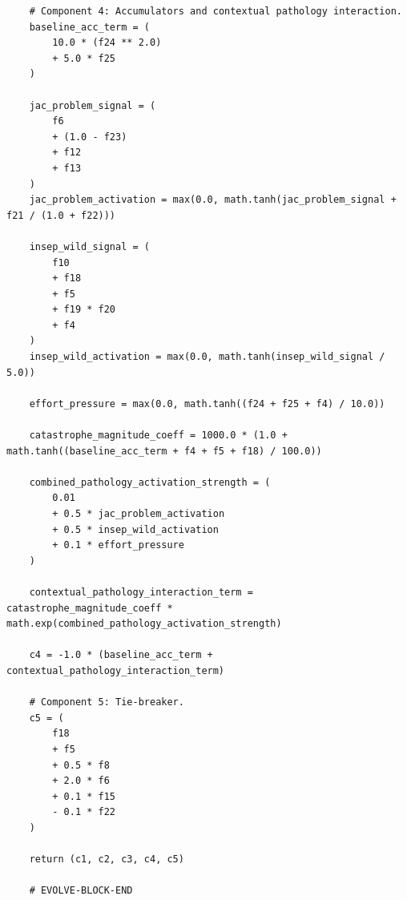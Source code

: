 \documentclass[11pt]{amsart}
\begin{document}
\begin{verbatim}
    # Component 4: Accumulators and contextual pathology interaction.
    baseline_acc_term = (
        10.0 * (f24 ** 2.0)
        + 5.0 * f25
    )

    jac_problem_signal = (
        f6
        + (1.0 - f23)
        + f12
        + f13
    )
    jac_problem_activation = max(0.0, math.tanh(jac_problem_signal + f21 / (1.0 + f22)))

    insep_wild_signal = (
        f10
        + f18
        + f5
        + f19 * f20
        + f4
    )
    insep_wild_activation = max(0.0, math.tanh(insep_wild_signal / 5.0))

    effort_pressure = max(0.0, math.tanh((f24 + f25 + f4) / 10.0))

    catastrophe_magnitude_coeff = 1000.0 * (1.0 + math.tanh((baseline_acc_term + f4 + f5 + f18) / 100.0))

    combined_pathology_activation_strength = (
        0.01
        + 0.5 * jac_problem_activation
        + 0.5 * insep_wild_activation
        + 0.1 * effort_pressure
    )

    contextual_pathology_interaction_term = catastrophe_magnitude_coeff * math.exp(combined_pathology_activation_strength)

    c4 = -1.0 * (baseline_acc_term + contextual_pathology_interaction_term)

    # Component 5: Tie-breaker.
    c5 = (
        f18
        + f5
        + 0.5 * f8
        + 2.0 * f6
        + 0.1 * f15
        - 0.1 * f22
    )

    return (c1, c2, c3, c4, c5)

    # EVOLVE-BLOCK-END
\end{verbatim}




\end{document}
